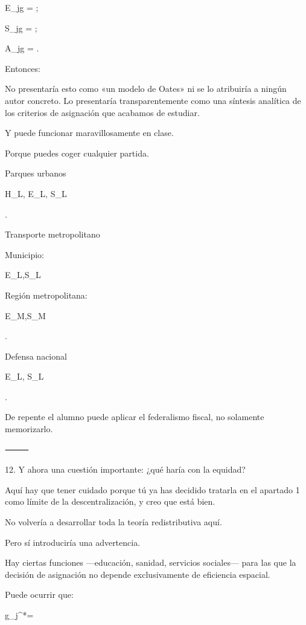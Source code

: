 \documentclass[10pt,a4paper]{article}
\begin{document}
E_{jg}
=
;

S_{jg}
=
;

A_{jg}
=
.

Entonces:


No presentaría esto como «un modelo de Oates» ni se lo atribuiría a ningún autor concreto. Lo presentaría transparentemente como una síntesis analítica de los criterios de asignación que acabamos de estudiar.

Y puede funcionar maravillosamente en clase.

Porque puedes coger cualquier partida.

Parques urbanos

H_L\downarrow,\quad
E_L,\quad
S_L

\Rightarrow{}.

Transporte metropolitano

Municipio:

E_L\uparrow,\quad S_L\uparrow

Región metropolitana:

E_M\downarrow,\quad S_M\downarrow

\Rightarrow{}.

Defensa nacional

E_L\rightarrow{},
\qquad
S_L\rightarrow{}

\Rightarrow{}.

De repente el alumno puede aplicar el federalismo fiscal, no solamente memorizarlo.

⸻

12. Y ahora una cuestión importante: ¿qué haría con la equidad?

Aquí hay que tener cuidado porque tú ya has decidido tratarla en el apartado 1 como límite de la descentralización, y creo que está bien.

No volvería a desarrollar toda la teoría redistributiva aquí.

Pero sí introduciría una advertencia.

Hay ciertas funciones —educación, sanidad, servicios sociales— para las que la decisión de asignación no depende exclusivamente de eficiencia espacial.

Puede ocurrir que:

g_j^*=
\end{document}
